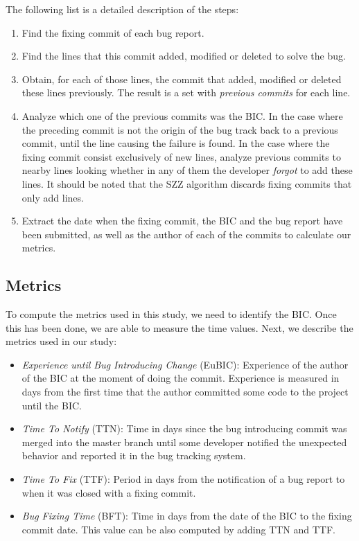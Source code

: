 \documentclass[10pt, conference]{IEEEtran}
\begin{document}
The following list is a detailed description of the steps: 

\begin{enumerate}
		\item Find the fixing commit of each bug report.
		\item Find the lines that this commit added, modified or deleted to solve the bug.
		\item Obtain, for each of those lines, the commit that added, modified or deleted these lines previously. The result is a set with \emph{previous commits} for each line.
		\item Analyze which one of the previous commits was the BIC. In the case where the preceding commit is not the origin of the bug track back to a previous commit, until the line causing the failure is found. In the case where the fixing commit consist exclusively of new lines, analyze previous commits to nearby lines looking whether in any of them the developer \emph{forgot} to add these lines. It should be noted that the SZZ algorithm discards fixing commits that only add lines.
		\item Extract the date when the fixing commit, the BIC and the bug report have been submitted, as well as the author of each of the commits to calculate our metrics.	
\end{enumerate} 


\subsection{Metrics}

To compute the metrics used in this study, we need to identify the BIC. Once this has been done, we are able to measure the time values. Next, we describe the metrics used in our study: 

\begin{itemize}
		\item \emph{Experience until Bug Introducing Change} (EuBIC): Experience of the author of the BIC at the moment of doing the commit. Experience is measured in days from the first time that the author committed some code to the project until the BIC.
		\item \emph{Time To Notify} (TTN): Time in days since the bug introducing commit was merged into the master branch until some developer notified the unexpected behavior and reported it in the bug tracking system. 
		\item \emph{Time To Fix} (TTF): Period in days from the notification of a bug report to when it was closed with a fixing commit.
		\item \emph{Bug Fixing Time} (BFT): Time in days from the date of the BIC to the fixing commit date. This value can be also computed by adding TTN and TTF.
\end{itemize} 
\end{document}
